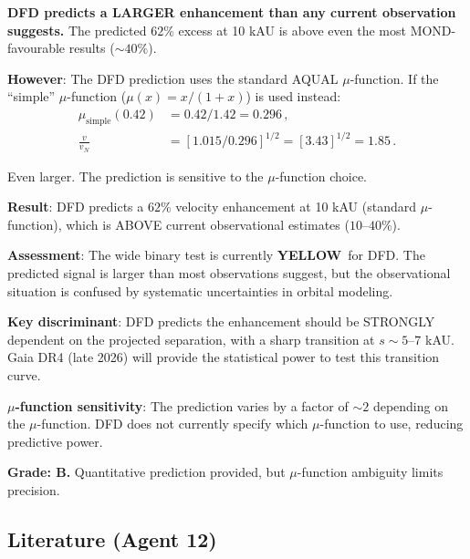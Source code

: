 \documentclass[11pt,a4paper]{article}
\newcommand{\YELLOW}{\textcolor{dfdyellow}{\textbf{YELLOW}}}
\begin{document}
\textbf{DFD predicts a LARGER enhancement than any current observation suggests.} The predicted $62\%$ excess at 10 kAU is above even the most MOND-favourable results ($\sim 40\%$).

\textbf{However}: The DFD prediction uses the standard AQUAL $\mu$-function. If the ``simple'' $\mu$-function ($\mu(x) = x/(1+x)$) is used instead:
\begin{align}
\mu_{\mathrm{simple}}(0.42) &= 0.42/1.42 = 0.296\,, \\
\frac{v}{v_N} &= [1.015/0.296]^{1/2} = [3.43]^{1/2} = 1.85\,.
\end{align}

Even larger. The prediction is sensitive to the $\mu$-function choice.

\begin{tcolorbox}[colback=yellow!5!white, colframe=yellow!60!black, title={Agent 12: Wide Binary EFE Prediction}]
\textbf{Result}: DFD predicts a $62\%$ velocity enhancement at 10 kAU (standard $\mu$-function), which is ABOVE current observational estimates ($10$--$40\%$).

\textbf{Assessment}: The wide binary test is currently \YELLOW\ for DFD. The predicted signal is larger than most observations suggest, but the observational situation is confused by systematic uncertainties in orbital modeling.

\textbf{Key discriminant}: DFD predicts the enhancement should be STRONGLY dependent on the projected separation, with a sharp transition at $s \sim 5$--$7$ kAU. Gaia DR4 (late 2026) will provide the statistical power to test this transition curve.

\textbf{$\mu$-function sensitivity}: The prediction varies by a factor of $\sim 2$ depending on the $\mu$-function. DFD does not currently specify which $\mu$-function to use, reducing predictive power.

\textbf{Grade: B.} Quantitative prediction provided, but $\mu$-function ambiguity limits precision.
\end{tcolorbox}

\subsection{Literature (Agent 12)}
\end{document}
